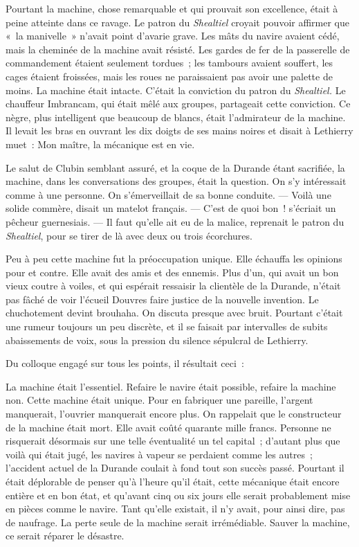 \documentclass[french,twoside]{book} %
\begin{document}
Pourtant la machine, chose remarquable et qui prouvait son excellence, était à peine atteinte dans ce ravage. Le patron du \emph{Shealtiel} croyait pouvoir affirmer que « la manivelle » n’avait point d’avarie grave. Les mâts du  navire avaient cédé, mais la cheminée de la machine avait résisté. Les gardes de fer de la passerelle de commandement étaient seulement tordues ; les tambours avaient souffert, les cages étaient froissées, mais les roues ne paraissaient pas avoir une palette de moins. La machine était intacte. C’était la conviction du patron du \emph{Shealtiel.} Le chauffeur Imbrancam, qui était mêlé aux groupes, partageait cette conviction. Ce nègre, plus intelligent que beaucoup de blancs, était l’admirateur de la machine. Il levait les bras en ouvrant les dix doigts de ses mains noires et disait à Lethierry muet : Mon maître, la mécanique est en vie.\par
Le salut de Clubin semblant assuré, et la coque de la Durande étant sacrifiée, la machine, dans les conversations des groupes, était la question. On s’y intéressait comme à une personne. On s’émerveillait de sa bonne conduite. — Voilà une solide commère, disait un matelot français. — C’est de quoi bon ! s’écriait un pêcheur guernesiais. — Il faut qu’elle ait eu de la malice, reprenait le patron du \emph{Shealtiel}, pour se tirer de là avec deux ou trois écorchures.\par
Peu à peu cette machine fut la préoccupation unique. Elle échauffa les opinions pour et contre. Elle avait des amis et des ennemis. Plus d’un, qui avait un bon vieux coutre à voiles, et qui espérait ressaisir la clientèle de la Durande, n’était pas fâché de voir l’écueil Douvres faire justice de la nouvelle invention. Le chuchotement devint brouhaha. On discuta presque avec bruit. Pourtant c’était une rumeur toujours un peu discrète, et il se faisait par intervalles de subits  abaissements de voix, sous la pression du silence sépulcral de Lethierry.\par
Du colloque engagé sur tous les points, il résultait ceci :\par
La machine était l’essentiel. Refaire le navire était possible, refaire la machine non. Cette machine était unique. Pour en fabriquer une pareille, l’argent manquerait, l’ouvrier manquerait encore plus. On rappelait que le constructeur de la machine était mort. Elle avait coûté quarante mille francs. Personne ne risquerait désormais sur une telle éventualité un tel capital ; d’autant plus que voilà qui était jugé, les navires à vapeur se perdaient comme les autres ; l’accident actuel de la Durande coulait à fond tout son succès passé. Pourtant il était déplorable de penser qu’à l’heure qu’il était, cette mécanique était encore entière et en bon état, et qu’avant cinq ou six jours elle serait probablement mise en pièces comme le navire. Tant qu’elle existait, il n’y avait, pour ainsi dire, pas de naufrage. La perte seule de la machine serait irrémédiable. Sauver la machine, ce serait réparer le désastre.\par
\end{document}
